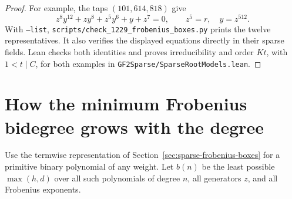 \documentclass[11pt]{article}
\begin{document}
\begin{proof}
For example, the taps \((101,614,818)\) give
\[
                  z^8y^{12}+zy^8+z^5y^6+y+z^7=0,
                  \qquad z^5=r,\quad y=z^{512}.
\]
With \texttt{--list}, \nolinkurl{scripts/check_1229_frobenius_boxes.py}
prints the twelve representatives. It also verifies the
displayed equations directly in their sparse fields. Lean checks both
identities and proves irreducibility and order \(Kt\), with \(1<t\mid C\),
for both examples in \nolinkurl{GF2Sparse/SparseRootModels.lean}.
\end{proof}

\section{How the minimum Frobenius bidegree grows with the degree}
\label{sec:frobenius-box-density}
Use the termwise representation of Section~\ref{sec:sparse-frobenius-boxes}
for a primitive binary polynomial of any weight. Let \(b(n)\) be the
least possible \(\max(h,d)\) over all such polynomials of degree \(n\),
all generators \(z\), and all Frobenius exponents.
\end{document}
